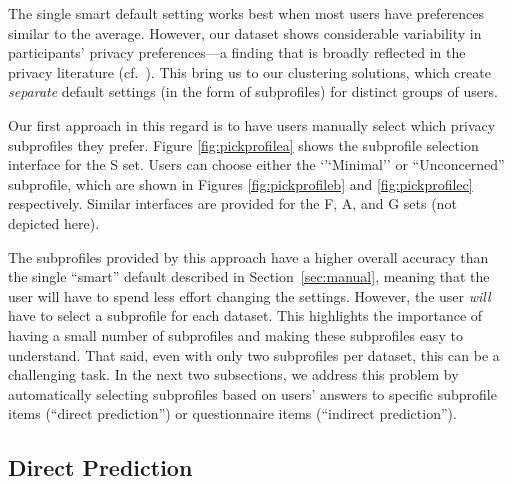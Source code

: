 The single smart default setting works best when most users have preferences similar to the average. However, our dataset shows considerable variability in participants' privacy preferences---a finding that is broadly reflected in the privacy literature (cf.~\cite{knijnenburg2013dimensionality}). This bring us to our clustering solutions, which create \emph{separate} default settings (in the form of subprofiles) for distinct groups of users.

Our first approach in this regard is to have users manually select which privacy subprofiles they prefer. Figure \ref{fig:pickprofilea} shows the subprofile selection interface for the S set. Users can choose either the `'`Minimal'' or ``Unconcerned'' subprofile, which are shown in Figures \ref{fig:pickprofileb} and \ref{fig:pickprofilec} respectively. Similar interfaces are provided for the F, A, and G sets (not depicted here).

The subprofiles provided by this approach have a higher overall accuracy than the single ``smart'' default described in Section~\ref{sec:manual}, meaning that the user will have to spend less effort changing the settings. However, the user \emph{will} have to select a subprofile for each dataset. This highlights the importance of having a small number of subprofiles and making these subprofiles easy to understand. That said, even with only two subprofiles per dataset, this can be a challenging task. In the next two subsections, we address this problem by automatically selecting subprofiles based on users' answers to specific subprofile items (``direct prediction'') or questionnaire items (``indirect prediction'').




\subsection{Direct Prediction}

